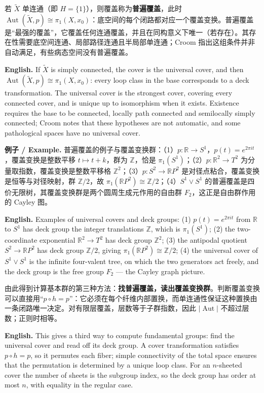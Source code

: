 \documentclass[UTF8,11pt,a4paper]{ctexart}
\newcommand{\EN}[1]{\par\noindent\textbf{English.} #1\par}
\newcommand{\EX}[2]{\par\noindent\textbf{例子 / Example.} #1\par\EN{#2}}
\begin{document}
\noindent 若 $\widetilde X$ 单连通（即 $H=\{1\}$），则覆盖称为\textbf{普遍覆盖}，此时 $\operatorname{Aut}(\widetilde X,p)\cong\pi_1(X,x_0)$：底空间的每个闭路都对应一个覆盖变换。普遍覆盖是“最强的覆盖”，它覆盖任何连通覆盖，并且在同构意义下唯一（若存在）。其存在性需要底空间连通、局部路径连通且半局部单连通；Croom 指出这组条件并非自动满足，有些病态空间没有普遍覆盖。
\EN{If $\widetilde X$ is simply connected, the cover is the universal cover, and then $\operatorname{Aut}(\widetilde X,p)\cong\pi_1(X,x_0)$: every loop class in the base corresponds to a deck transformation. The universal cover is the strongest cover, covering every connected cover, and is unique up to isomorphism when it exists. Existence requires the base to be connected, locally path connected and semilocally simply connected; Croom notes that these hypotheses are not automatic, and some pathological spaces have no universal cover.}

\EX{普遍覆盖的例子与覆盖变换群：（1）$p:\mathbb R\to S^1$，$p(t)=e^{2\pi it}$，覆盖变换是整数平移 $t\mapsto t+k$，群为 $\mathbb Z$，恰是 $\pi_1(S^1)$；（2）$p:\mathbb R^2\to T^2$ 为分量取指数，覆盖变换是整数平移格 $\mathbb Z^2$；（3）$p:S^2\to\mathbb R P^2$ 是对径点粘合，覆盖变换是恒等与对径映射，群 $\mathbb Z/2$，故 $\pi_1(\mathbb R P^2)\cong\mathbb Z/2$；（4）$S^1\vee S^1$ 的普遍覆盖是四价无限树，其覆盖变换群是两个圆周生成元作用的自由群 $F_2$，这正是自由群作用的 Cayley 图。}{Examples of universal covers and deck groups: (1) $p(t)=e^{2\pi it}$ from $\mathbb R$ to $S^1$ has deck group the integer translations $\mathbb Z$, which is $\pi_1(S^1)$; (2) the two-coordinate exponential $\mathbb R^2\to T^2$ has deck group $\mathbb Z^2$; (3) the antipodal quotient $S^2\to\mathbb R P^2$ has deck group $\mathbb Z/2$, giving $\pi_1(\mathbb R P^2)\cong\mathbb Z/2$; (4) the universal cover of $S^1\vee S^1$ is the infinite four-valent tree, on which the two generators act freely, and the deck group is the free group $F_2$ — the Cayley graph picture.}

\noindent 由此得到计算基本群的第三种方法：\textbf{找普遍覆盖，读出覆盖变换群}。判断覆盖变换可以直接用“$p\circ h=p$”：它必须在每个纤维内部置换，而单连通性保证这种置换由一条闭路唯一决定。对有限层覆盖，层数等于子群指数，因此 $|\operatorname{Aut}|$ 不超过层数；正则时相等。
\EN{This gives a third way to compute fundamental groups: find the universal cover and read off its deck group. A cover transformation satisfies $p\circ h=p$, so it permutes each fiber; simple connectivity of the total space ensures that the permutation is determined by a unique loop class. For an $n$-sheeted cover the number of sheets is the subgroup index, so the deck group has order at most $n$, with equality in the regular case.}
\end{document}

